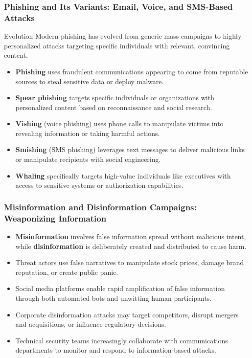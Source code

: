 \documentclass{beamer}
\begin{document}
\begin{frame}
    \frametitle{Phishing and Its Variants: Email, Voice, and SMS-Based Attacks}
    
    \begin{alertblock}{Evolution}
        Modern phishing has evolved from generic mass campaigns to highly personalized attacks targeting specific individuals with relevant, convincing content.
    \end{alertblock}
    
    \begin{itemize}
        \item \textbf{Phishing} uses fraudulent communications appearing to come from reputable sources to steal sensitive data or deploy malware.
        \item \textbf{Spear phishing} targets specific individuals or organizations with personalized content based on reconnaissance and social research.
        \item \textbf{Vishing} (voice phishing) uses phone calls to manipulate victims into revealing information or taking harmful actions.
        \item \textbf{Smishing} (SMS phishing) leverages text messages to deliver malicious links or manipulate recipients with social engineering.
        \item \textbf{Whaling} specifically targets high-value individuals like executives with access to sensitive systems or authorization capabilities.
    \end{itemize}
\end{frame}

\begin{frame}
    \frametitle{Misinformation and Disinformation Campaigns: Weaponizing Information}
    
    \begin{itemize}
        \item \textbf{Misinformation} involves false information spread without malicious intent, while \textbf{disinformation} is deliberately created and distributed to cause harm.
        \item Threat actors use false narratives to manipulate stock prices, damage brand reputation, or create public panic.
        \item Social media platforms enable rapid amplification of false information through both automated bots and unwitting human participants.
        \item Corporate disinformation attacks may target competitors, disrupt mergers and acquisitions, or influence regulatory decisions.
        \item Technical security teams increasingly collaborate with communications departments to monitor and respond to information-based attacks.
    \end{itemize}
\end{frame}
\end{document}
